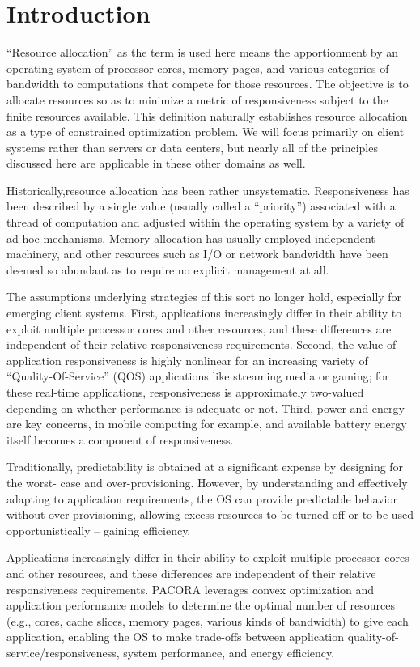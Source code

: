 \section{Introduction}




``Resource allocation'' as the term is used here means the apportionment by an operating system of processor cores, memory pages, and various categories of  bandwidth to computations that compete for those resources.  The objective is to allocate resources so as to minimize a metric of responsiveness subject to the finite resources available.  This definition naturally establishes resource allocation as a type of constrained optimization problem.  We will focus primarily on client systems rather than servers or data centers, but nearly all of the principles discussed here are applicable in these other domains as well.

Historically,resource allocation has been rather unsystematic.  Responsiveness has been described by a single value (usually called a “priority”) associated with a thread of computation and adjusted within the operating system by a variety of ad-hoc mechanisms.  Memory allocation has usually employed independent machinery, and other resources such as I/O or network bandwidth have been deemed so abundant as to require no explicit management at all.

The assumptions underlying strategies of this sort no longer hold, especially for emerging client systems.  First, applications increasingly differ in their ability to exploit multiple processor cores and other resources, and these differences are independent of their relative responsiveness requirements.  Second, the value of application responsiveness is highly nonlinear for an increasing variety of “Quality-Of-Service” (QOS) applications like streaming media or gaming; for these real-time applications, responsiveness is approximately two-valued depending on whether performance is adequate or not.  Third, power and energy are key concerns, in mobile computing for example, and available battery energy itself becomes a component of responsiveness.

Traditionally, predictability is obtained at a significant expense by designing for the worst- case and over-provisioning.  However, by understanding and effectively adapting to application requirements, the OS can provide predictable behavior without over-provisioning, allowing excess resources to be turned off or to be used opportunistically -- gaining efficiency.

Applications increasingly differ in their ability to exploit multiple processor cores and other resources, and these differences are independent of their relative responsiveness requirements. PACORA leverages convex optimization and application performance models to determine the optimal number of resources (e.g., cores, cache slices, memory pages, various kinds of bandwidth) to give each application, enabling the OS to make trade-offs between application quality-of-service/responsiveness, system performance, and energy efficiency.
